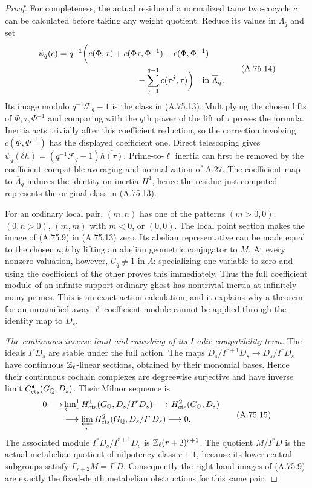 \begin{proof}
For completeness, the actual residue of a normalized tame
two-cocycle $c$ can be calculated before taking any weight
quotient.  Reduce its values in $\overline\Lambda_q$ and set
\[
 \begin{split}
 \psi_q(c)=q^{-1}\biggl(&
 c(\Phi,\tau)+c(\Phi\tau,\Phi^{-1})
       -c(\Phi,\Phi^{-1})\\
 &\hspace{20mm}
       -\sum_{j=1}^{q-1}c(\tau^j,\tau)\biggr)
       \quad\text{in }\overline\Lambda_q .
 \end{split}
 \tag{A.75.14}
\]
Its image modulo $q^{-1}\mathcal F_q-1$ is the class in
(A.75.13).  Multiplying the chosen lifts of
$\Phi,\tau,\Phi^{-1}$ and comparing with the $q$th power
of the lift of $\tau$ proves the formula.
Inertia acts trivially after this coefficient reduction,
so the correction involving $c(\Phi,\Phi^{-1})$ has the
displayed coefficient one.
Direct telescoping gives
$\psi_q(\delta h)=(q^{-1}\mathcal F_q-1)\overline{h(\tau)}$.
Prime-to-$\ell$ inertia can first be removed by the
coefficient-compatible averaging and normalization of A.27.
The coefficient map to $\overline\Lambda_q$ induces the
identity on inertia $H^1$, hence the residue just computed
represents the original class in (A.75.13).

For an ordinary local pair,
$(m,n)$ has one of the patterns
$(m>0,0)$, $(0,n>0)$, $(m,m)$ with $m<0$, or $(0,0)$.
The local point section makes the image of (A.75.9) in
(A.75.13) zero.
Its abelian representative can be made equal to the chosen
$a,b$ by lifting an abelian geometric conjugator to $M$.
At every nonzero valuation, however, $U_q\ne1$ in $\Lambda$:
specializing one variable to zero and using the coefficient
of the other proves this immediately.
Thus the full coefficient module of an infinite-support
ordinary ghost has nontrivial inertia at infinitely many
primes.  This is an exact action calculation, and it explains
why a theorem for an unramified-away-$\ell$ coefficient module
cannot be applied through the identity map to $D_s$.

\emph{The continuous inverse limit and vanishing of its
$I$-adic compatibility term.}
The ideals $I^rD_s$ are stable under the full action.
The maps $D_s/I^{r+1}D_s\to D_s/I^rD_s$ have continuous
$\mathbb Z_\ell$-linear sections, obtained by their monomial bases.
Hence their continuous cochain complexes are degreewise
surjective and have inverse limit $C^\bullet_{\rm cts}(G_\mathbb Q,D_s)$.
Their Milnor sequence is
\[
 \begin{split}
 0\longrightarrow&
 \varprojlim\nolimits_r^1
 H^1_{\rm cts}(G_\mathbb Q,D_s/I^rD_s)
 \longrightarrow H^2_{\rm cts}(G_\mathbb Q,D_s)\\
 &\longrightarrow
 \varprojlim_r H^2_{\rm cts}(G_\mathbb Q,D_s/I^rD_s)
 \longrightarrow0 .
 \end{split}
 \tag{A.75.15}
\]
The associated module
$I^rD_s/I^{r+1}D_s$ is
$\mathbb Z_\ell(r+2)^{r+1}$.
The quotient $M/I^rD$ is the actual metabelian quotient
of nilpotency class $r+1$, because its lower central
subgroups satisfy $\Gamma_{r+2}M=I^rD$.
Consequently the right-hand images of (A.75.9) are exactly
the fixed-depth metabelian obstructions for this same pair.


\end{proof}
